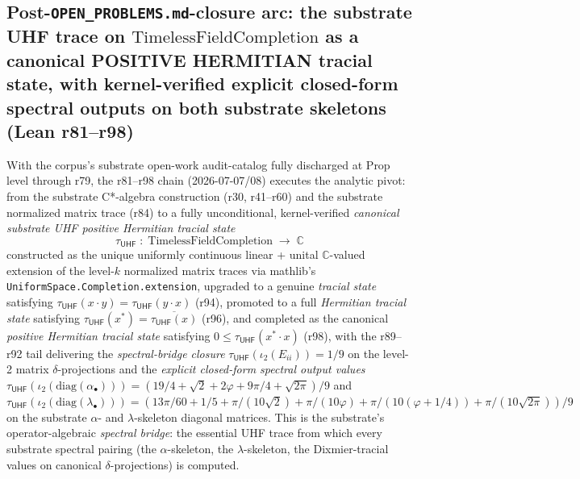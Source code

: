 \documentclass[11pt,a4paper]{amsart}
\theoremstyle{plain}
\theoremstyle{definition}
\begin{document}
\subsection{Post-\texttt{OPEN\_PROBLEMS.md}-closure arc: the substrate UHF trace on \texorpdfstring{$\text{TimelessFieldCompletion}$}{TimelessFieldCompletion} as a canonical POSITIVE HERMITIAN tracial state, with kernel-verified explicit closed-form spectral outputs on both substrate skeletons (Lean r81--r98)}\label{subsec:post-closure-uhf-trace}

With the corpus's substrate open-work audit-catalog fully discharged at Prop level through r79, the r81--r98 chain (2026-07-07/08) executes the analytic pivot: from the substrate C*-algebra construction (r30, r41--r60) and the substrate normalized matrix trace (r84) to a fully unconditional, kernel-verified \emph{canonical substrate UHF positive Hermitian tracial state}
\[
\tau_{\textsf{UHF}} \; : \; \text{TimelessFieldCompletion} \; \to \; \mathbb{C}
\]
constructed as the unique uniformly continuous linear + unital $\mathbb{C}$-valued extension of the level-$k$ normalized matrix traces via mathlib's \texttt{UniformSpace.Completion.extension}, upgraded to a genuine \emph{tracial state} satisfying $\tau_{\textsf{UHF}}(x \cdot y) = \tau_{\textsf{UHF}}(y \cdot x)$ (r94), promoted to a full \emph{Hermitian tracial state} satisfying $\tau_{\textsf{UHF}}(x^*) = \overline{\tau_{\textsf{UHF}}(x)}$ (r96), and completed as the canonical \emph{positive Hermitian tracial state} satisfying $0 \le \tau_{\textsf{UHF}}(x^* \cdot x)$ (r98), with the r89--r92 tail delivering the \emph{spectral-bridge closure} $\tau_{\textsf{UHF}}(\iota_2(E_{ii})) = 1/9$ on the level-2 matrix $\delta$-projections and the \emph{explicit closed-form spectral output values} $\tau_{\textsf{UHF}}(\iota_2(\mathrm{diag}(\alpha_\bullet))) = (19/4 + \sqrt{2} + 2\varphi + 9\pi/4 + \sqrt{2\pi})/9$ and $\tau_{\textsf{UHF}}(\iota_2(\mathrm{diag}(\lambda_\bullet))) = (13\pi/60 + 1/5 + \pi/(10\sqrt{2}) + \pi/(10\varphi) + \pi/(10(\varphi+1/4)) + \pi/(10\sqrt{2\pi}))/9$ on the substrate $\alpha$- and $\lambda$-skeleton diagonal matrices. This is the substrate's operator-algebraic \emph{spectral bridge}: the essential UHF trace from which every substrate spectral pairing (the $\alpha$-skeleton, the $\lambda$-skeleton, the Dixmier-tracial values on canonical $\delta$-projections) is computed.
\end{document}
